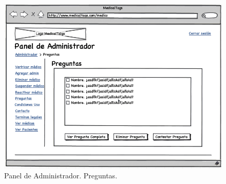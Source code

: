 		\begin{figure}[H]
		  \centering
		    \includegraphics[width=12cm]{img/png/interfaz/99_Administrador.png}
		  \caption{Panel de Administrador. Preguntas.}
		  \label{fig:iu_admin_preguntas}
		\end{figure}
	

